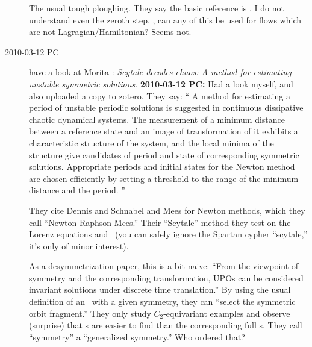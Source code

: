 \begin{description}
The usual tough ploughing. They say the basic reference is .
I do not understand even the zeroth step, \ie, can any of this be used for
flows which are not Lagragian/Hamiltonian? Seems not.

\item[2010-03-12 PC] have a look at Morita \etal{}:
    {\em Scytale decodes chaos: {A} method for estimating
    unstable symmetric solutions}.
{\bf 2010-03-12 PC:} Had a look myself, and also uploaded a copy to
{zotero}. They say: ``
A method for estimating a period of unstable periodic solutions
is suggested in continuous dissipative chaotic dynamical
systems. The measurement of a minimum distance between a
reference state and an image of transformation of it exhibits a
characteristic structure of the system, and the local minima of
the structure give candidates of period and state of
corresponding symmetric solutions. Appropriate periods and
initial states for the Newton method are chosen efficiently by
setting a threshold to the range of the minimum distance and
the period.
	''

											\toCB
They cite Dennis and Schnabel and Mees for Newton
methods, which they call ``Newton-Raphson-Mees.'' Their ``Scytale''
method they test on the Lorenz equations and \KSe\ (you can safely ignore
the Spartan cypher  ``scytale,'' it's only of minor interest).

As a desymmetrization paper, this is a bit naive: ``From the viewpoint of
symmetry and the corresponding transformation, UPOs can be considered
invariant solutions under discrete time translation.'' By using the usual
definition of an \rpo\ with a given symmetry, they can ``select the
symmetric orbit fragment.'' They only study $C_2$-equivariant examples
and observe (surprise) that \rpo s are easier to find than the
corresponding full \po s. They call ``symmetry'' a ``generalized
symmetry.'' Who ordered that?


\end{description}
